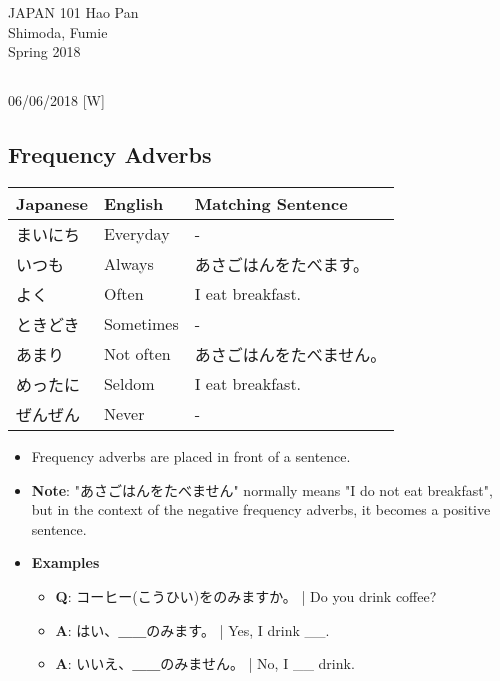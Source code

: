 \documentclass{article}
\begin{document}
 \begin{CJK}{UTF8}{min}

\noindent
{JAPAN 101 \hfill Hao Pan}\\
{Shimoda, Fumie}\\
{Spring 2018}


\begin{center}
\section{}
\noindent
{\hfill 06/06/2018 [W]}
\end{center}

\subsection{Frequency Adverbs}

\begin{tabular}{ l | l || l }
Japanese & English & Matching Sentence\\
\hline
まいにち & Everyday & -\\
いつも & Always & あさごはんをたべます。\\
よく & Often & I eat breakfast.\\
ときどき & Sometimes & -\\
\hline
あまり & Not often & あさごはんをたべません。\\
めったに & Seldom & I eat breakfast.\\
ぜんぜん & Never & -\\
\end{tabular}

\begin{itemize}
\item Frequency adverbs are placed in front of a sentence.
\item {\bf Note}: "あさごはんをたべません" normally means "I do not eat breakfast", but in the context of the negative frequency adverbs, it becomes a positive sentence.
\item {\bf Examples}
\begin{itemize}
\item {\bf Q}: コーヒー(こうひい)をのみますか。 | Do you drink coffee?
\item {\bf A}: はい、＿＿のみます。 | Yes, I drink \_\_.
\item {\bf A}: いいえ、＿＿のみません。 | No, I \_\_ drink.
\end{itemize}
\end{itemize}


\end{CJK}
\end{document}
